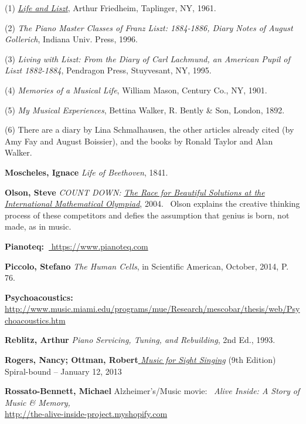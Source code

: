 \documentclass[11pt,a4paper]{book}
\begin{document}
(1)
\href{http://https//archive.org/details/lifelisztrecolle00frie}{\emph{Life
and Liszt}}, Arthur Friedheim, Taplinger, NY, 1961.

(2) \emph{The Piano Master Classes of Franz Liszt: 1884-1886, Diary
Notes of August Gollerich}, Indiana Univ. Press, 1996.

(3) \emph{Living with Liszt: From the Diary of Carl Lachmund, an
American Pupil of Liszt 1882-1884}, Pendragon Press, Stuyvesant, NY,
1995.

(4) \emph{Memories of a Musical Life}, William Mason, Century Co., NY,
1901.

(5) \emph{My Musical Experiences}, Bettina Walker, R. Bently \& Son,
London, 1892.

(6) There are a diary by Lina Schmalhausen, the other articles already
cited (by Amy Fay and August Boissier), and the books by Ronald
Taylor \label{r:Taylor} and Alan Walker\label{r:Walker}.

\textbf{Moscheles, Ignace}{ \emph{Life of
Beethoven}, 1841.}

{\textbf{Olson, Steve}} \emph{COUNT DOWN:}
\href{http://www.amazon.com/gp/product/0618562125/ref=pd_lpo_sbs_dp_ss_1?pf_rd_p=1944687702\&pf_rd_s=lpo-top-stripe-1\&pf_rd_t=201\&pf_rd_i=0618251413\&pf_rd_m=ATVPDKIKX0DER\&pf_rd_r=0PWYGKD2ES8YH1GEVZ69}{\emph{The
Race for Beautiful Solutions at the International Mathematical
Olympiad}}, 2004.{~ }Olson explains the creative thinking process of
these competitors and defies the assumption that genius is born, not
made, as in music.

\textbf{Pianoteq:{~}}\href{https://www.pianoteq.com/}{{
https://www.pianoteq.com}}

{\textbf{Piccolo, Stefano}} \emph{The Human
Cells}, in Scientific American, October, 2014, P. 76.

{\textbf{Psychoacoustics:}\\
\href{http://www.music.miami.edu/programs/mue/Research/mescobar/thesis/web/Psychoacoustics.htm}{{
http://www.music.miami.edu/programs/mue/Research/mescobar/thesis/web/Psychoacoustics.htm}}}

\textbf{\hypertarget{r:reblitz}{Reblitz, Arthur}} \emph{Piano Servicing,
Tuning, and Rebuilding}, 2nd Ed., 1993.

{\textbf{Rogers, Nancy; Ottman,
Robert}\href{http://www.amazon.com/Music-Sight-Singing-9th-Edition/dp/0205938337/ref=pd_bxgy_b_img_y}{{
\emph{Music for Sight Singing}}}} (9th Edition) Spiral-bound -- January
12, 2013

{\textbf{Rossato-Bennett, Michael}}
Alzheimer's/Music movie:{~} \emph{Alive Inside: A Story of Music \&
Memory,}\\
\href{http://the-alive-inside-project.myshopify.com/}{http://the-alive-inside-project.myshopify.com}
\end{document}
